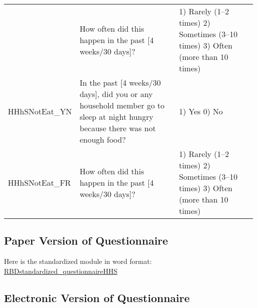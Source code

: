 \documentclass[
]{book}
\begin{document}
\begin{longtable}[]{@{}lll@{}}
\begin{minipage}[t]{0.17\columnwidth}
\end{minipage} & \begin{minipage}[t]{0.56\columnwidth}\raggedright
How often did this happen in the past {[}4 weeks/30 days{]}?\strut
\end{minipage} & \begin{minipage}[t]{0.17\columnwidth}\raggedright
1) Rarely (1--2 times) 2) Sometimes (3--10 times) 3) Often (more than 10 times)\strut
\end{minipage}\tabularnewline
\begin{minipage}[t]{0.17\columnwidth}\raggedright
HHhSNotEat\_YN\strut
\end{minipage} & \begin{minipage}[t]{0.56\columnwidth}\raggedright
In the past {[}4 weeks/30 days{]}, did you or any household member go to sleep at night hungry because there was not enough food?\strut
\end{minipage} & \begin{minipage}[t]{0.17\columnwidth}\raggedright
1) Yes 0) No\strut
\end{minipage}\tabularnewline
\begin{minipage}[t]{0.17\columnwidth}\raggedright
HHhSNotEat\_FR\strut
\end{minipage} & \begin{minipage}[t]{0.56\columnwidth}\raggedright
How often did this happen in the past {[}4 weeks/30 days{]}?\strut
\end{minipage} & \begin{minipage}[t]{0.17\columnwidth}\raggedright
1) Rarely (1--2 times) 2) Sometimes (3--10 times) 3) Often (more than 10 times)\strut
\end{minipage}\tabularnewline
\bottomrule
\end{longtable}

\hypertarget{paper-version-of-questionnaire}{%
\subsection{Paper Version of Questionnaire}\label{paper-version-of-questionnaire}}

Here is the standardized module in word format:
\href{https://github.com/WFP-VAM/RBD_FS_CH_guide_EN/blob/master/questionnaires/RBDstandardized_questionnaireHHS.xlsx}{RBDstandardized\_questionnaireHHS}

\hypertarget{electronic-version-of-questionnaire}{%
\subsection{Electronic Version of Questionnaire}\label{electronic-version-of-questionnaire}}
\end{document}
